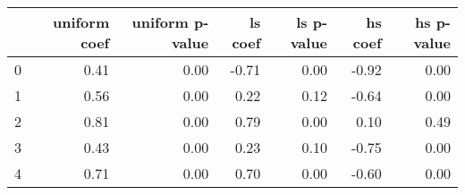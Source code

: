 \begin{tabular}{lrrrrrr}
\toprule
 & uniform coef & uniform p-value & ls coef & ls p-value & hs coef & hs p-value \\
\midrule
0 & 0.41 & 0.00 & -0.71 & 0.00 & -0.92 & 0.00 \\
1 & 0.56 & 0.00 & 0.22 & 0.12 & -0.64 & 0.00 \\
2 & 0.81 & 0.00 & 0.79 & 0.00 & 0.10 & 0.49 \\
3 & 0.43 & 0.00 & 0.23 & 0.10 & -0.75 & 0.00 \\
4 & 0.71 & 0.00 & 0.70 & 0.00 & -0.60 & 0.00 \\
\bottomrule
\end{tabular}
